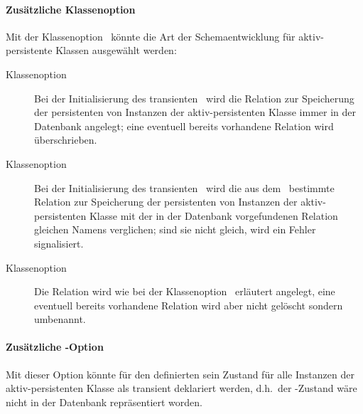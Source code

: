 \paragraph{Zus\"{a}tzliche Klassenoption \protect{}}
%
Mit der Klassenoption \ k\"{o}nn\-te die Art der
Schemaentwicklung f\"{u}r aktiv-persistente Klassen ausgew\"{a}hlt werden:
\begin{description}
%
\item[Klassenoption \protect{}]
Bei der Initialisierung des transienten \clsmo[es]\ wird die Relation
zur Speicherung der persistenten \representations{} von Instanzen der
aktiv-persistenten Klasse immer in der Datenbank angelegt; eine
eventuell bereits vorhandene Relation wird \"{u}berschrieben.
%
\item[Klassenoption \protect{}]
Bei der Initialisierung des transienten \clsmo[es]\ wird die aus dem
\clsmo\ bestimmte Relation zur Speicherung der persistenten
\representations{} von Instanzen der aktiv-persistenten Klasse mit der
in der Datenbank vorgefundenen Relation gleichen Namens verglichen;
sind sie nicht gleich, wird ein Fehler signalisiert.
%
\item[Klassenoption \protect{}]
Die Relation wird wie bei der Klassenoption \ erl\"{a}utert angelegt, eine eventuell bereits 
vorhandene Relation wird aber nicht gel\"{o}scht sondern umbenannt.
%
\end{description}
%
\paragraph{Zus\"{a}tzliche \protect\Slt-Option \protect{}}
%
Mit dieser Option k\"{o}nnte f\"{u}r den definierten \Slt\/ sein Zustand f\"{u}r
alle Instanzen der aktiv-persistenten Klasse als transient deklariert
werden, d.h.\ der \Slt\/-Zustand w\"{a}re nicht in der Datenbank
repr\"{a}sentiert worden.
%
%
%
%
%
%
